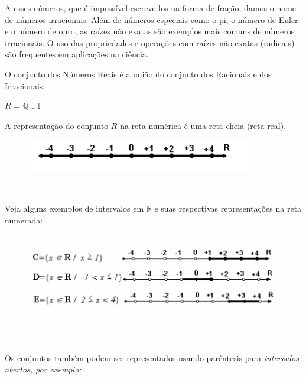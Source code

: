 A esses números, que é impossível escreve-los na forma de fração, damos o nome de números irracionais. Além de números especiais como o pi, o número de Euler e o número de ouro, as raízes não exatas são exemplos mais comuns de números irracionais. O uso das propriedades e operações com raízes não exatas (radicais) são frequentes em aplicações na ciência.
\begin{caixa}
	\begin{tdefinicao}
		
		O conjunto dos Números Reais é a união do conjunto dos Racionais e dos Irracionais.

		\quad  \( R \)  =  \( \mathbb{Q} \cup \mathbb{I}\) \qedsymbol{}
	\end{tdefinicao}
\end{caixa}
A representação do conjunto  \( R \)  na reta numérica é uma reta cheia (reta real).

\begin{figure}[H]
	\begin{Center}
		\includegraphics[width=3.9in,height=0.57in]{capitulos/conjuntos_numericos/media/image9.pdf}
	\end{Center}
\end{figure}

~~

Veja alguns exemplos de intervalos em  \( \mathbb{R} \) e suas respectivas representações na reta numerada:

\begin{figure}[H]
	\begin{Center}
		\includegraphics[width=5.72in,height=1.53in]{capitulos/conjuntos_numericos/media/image10.pdf}
	\end{Center}
\end{figure}

~~

Os conjuntos também podem ser representados usando parêntesis para \textit{intervalos abertos, por exemplo:}

